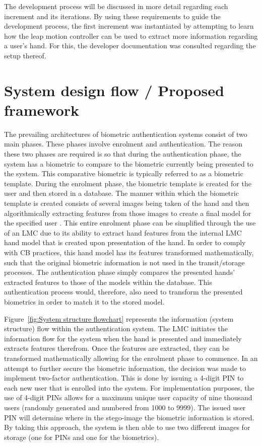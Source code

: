 	
The development process will be discussed in more detail regarding each increment and its iterations.
By using these requirements to guide the development process, the first increment was instantiated by attempting to learn how the leap motion controller can be used to extract more information regarding a user’s hand. For this, the developer documentation was consulted regarding the setup thereof.

\section{System design flow / Proposed framework}

The prevailing architectures of biometric authentication systems consist of two main phases. These phases involve enrolment and authentication. The reason these two phases are required is so that during the authentication phase, the system has a biometric to compare to the biometric currently being presented to the system. This comparative biometric is typically referred to as a biometric template. During the enrolment phase, the biometric template is created for the user and then stored in a database. The manner within which the biometric template is created consists of several images being taken of the hand and then algorithmically extracting features from those images to create a final model for the specified user \citep{Varchol2007}. This entire enrolment phase can be simplified through the use of an LMC due to its ability to extract hand features from the internal LMC hand model that is created upon presentation of the hand. In order to comply with CB practices, this hand model has its features transformed mathematically, such that the original biometric information is not used in the transit/storage processes. The authentication phase simply compares the presented hands’ extracted features to those of the models within the database. This authentication process would, therefore, also need to transform the presented biometrics in order to match it to the stored model.

Figure~\ref{fig:System structure flowchart} represents the information (system structure) flow within the authentication system. The LMC initiates the information flow for the system when the hand is presented and immediately extracts features therefrom. Once the features are extracted, they can be transformed mathematically allowing for the enrolment phase to commence. In an attempt to further secure the biometric information, the decision was made to implement two-factor authentication. This is done by issuing a 4-digit PIN to each new user that is enrolled into the system. For implementation purposes, the use of 4-digit PINs allows for a maximum unique user capacity of nine thousand users (randomly generated and numbered from 1000 to 9999). The issued user PIN will determine where in the stego-image the biometric information is stored. By taking this approach, the system is then able to use two different images for storage (one for PINs and one for the biometrics). 

